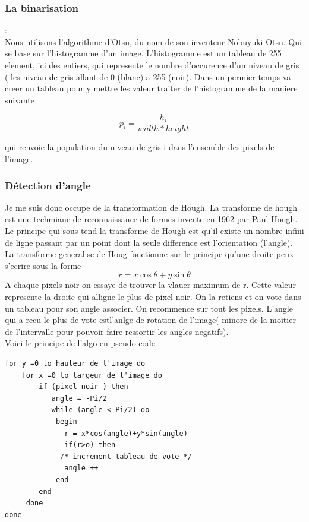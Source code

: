 \documentclass{article}
\begin{document}
\subsubsection{La binarisation}
:\\
Nous utilisons l'algorithme d'Otsu, du nom de son inventeur Nobuyuki Otsu. Qui se base sur l'histogramme d'un image. L'histogramme est un tableau de 255 element, ici des entiers, qui represente le nombre d'occurence d'un niveau de gris ( les niveau de gris allant de 0 (blanc) a 255 (noir). Dans un permier temps va creer un tableau pour y mettre les valeur traiter de l'histogramme de la maniere suivante 
\begin{center}
\[ p_{i} = \frac{h_{i}} {width * height}\]
\end{center}
qui renvoie la population du niveau de gris i dans l'ensemble des pixels de l'image.
\subsubsection{Détection d'angle}
Je me suis donc occupe de la transformation de Hough. La transforme de hough est une techmiaue de reconnaissance de formes invente en 1962 par Paul Hough.
Le principe qui sous-tend la transforme de Hough est qu'il existe un nombre infini de ligne passant par un point dont la seule difference est l'orientation (l'angle). La transforme generalise de Houg fonctionne sur le principe qu'une droite peux s'ecrire sous la forme 
\[r = x\cos{\theta}+y\sin{\theta}\]
A chaque pixels noir on essaye de trouver la vlauer maximum de r. Cette valeur represente la droite qui alligne le plus de pixel noir. On la retiens et on vote dans un tableau pour son angle associer. On recommence sur tout les pixels. L'angle qui a recu le plus de vote estl'anlge de rotation de l'image( minore de la moitier de l'intervalle pour pouvoir faire ressortir les angles negatifs).
\\
Voici le principe de l'algo en pseudo code :
\begin{lstlisting}
for y =0 to hauteur de l'image do
    for x =0 to largeur de l'image do
        if (pixel noir ) then
           angle = -Pi/2
           while (angle < Pi/2) do
            begin
              r = x*cos(angle)+y*sin(angle)
              if(r>o) then
             /* increment tableau de vote */          
              angle ++
            end
        end
     done
done

\end{lstlisting} 
\end{document}
